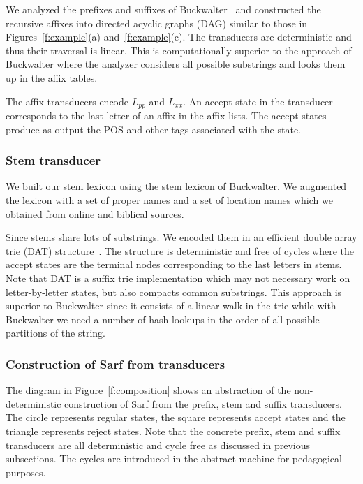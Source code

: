 \documentclass[a4,12pt]{report}
\begin{document}
We analyzed the prefixes and suffixes of 
Buckwalter~\cite{Buckwalter:02}
and constructed the recursive affixes
into directed acyclic graphs (DAG) similar to 
those in Figures~\ref{f:example}(a) and~\ref{f:example}(c).
The transducers are deterministic and thus 
their traversal is linear.
This is computationally superior to the 
approach of Buckwalter where the analyzer considers
all possible substrings %
and looks them up in the affix tables. 

The affix transducers encode $L_{pp}$ and
$L_{xx}$.
An accept state in the transducer corresponds to the last letter 
of an affix in the affix lists.
The accept states produce as output the POS and other tags
associated with the state.

\subsubsection{Stem transducer}
\label{sec:stemFSA}

We built our stem lexicon using the stem lexicon of 
Buckwalter. 
We augmented the lexicon with a set of proper names and
a set of location names which we 
obtained from online and biblical sources. 

Since stems share lots of substrings. 
We encoded them in
an efficient double array trie (DAT) structure~\cite{Aoe:89}. 
The structure is deterministic and free of cycles where the 
accept states are the terminal nodes corresponding to the last 
letters in stems. 
Note that DAT is a suffix trie implementation which may not 
necessary work on letter-by-letter states, but also compacts
common substrings.
This approach is superior to Buckwalter since it consists of
a linear walk in the trie while with Buckwalter we need
a number of hash lookups in the order of all possible partitions
of the string.

\subsubsection{Construction of Sarf from transducers}
\label{sec:ndfsa}

The diagram in Figure~\ref{f:composition} shows an 
abstraction of the non-deterministic construction of Sarf
from the prefix, stem and suffix transducers. 
The circle represents regular states, the square
represents accept states and the triangle represents
reject states. 
Note that the concrete prefix, stem and suffix transducers
are all deterministic and cycle free as discussed 
in previous subsections.
The cycles are introduced in the abstract machine
for pedagogical purposes.
\end{document}
